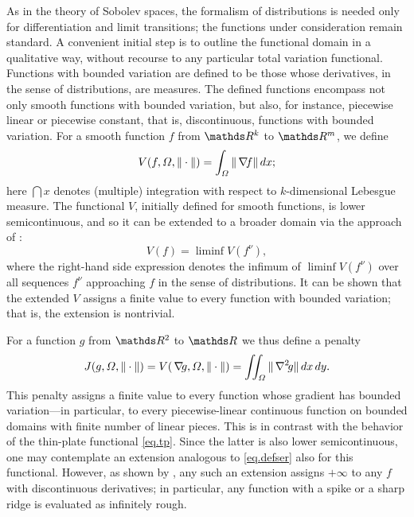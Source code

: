 As in the theory of Sobolev spaces, the formalism of distributions is
needed only for differentiation and limit transitions; the functions
under consideration remain standard. A convenient initial step is to
outline the functional domain in a qualitative way, without recourse
to any particular total variation functional. Functions with bounded
variation are defined to be those whose derivatives, in the sense of
distributions, are measures. The defined functions
encompass not only smooth functions with bounded variation, but also,
for instance, piecewise linear or piecewise constant, that is, discontinuous,
functions with bounded variation. For a smooth function $f$ from
$\RR^k$ to $\RR^m$, we define
\begin{equation}
\label{eq.defvar}
V (f, \varOmega, \|\cdot\|)
        = \int_\varOmega \| \,\nabla\! f \| \,d x;
\end{equation}
here $\dint x$ denotes (multiple) integration with respect to
$k$-dimensional Lebesgue measure. The functional $V$, initially
defined for smooth functions, is lower semicontinuous, and so it can be
extended to a broader domain via the approach of :
\begin{equation}
\label{eq.defser}
V(f) = \liminf V(f^\nu),
\end{equation}
where the right-hand side expression denotes the infimum of $\liminf
V(f^\nu)$ over all sequences $f^\nu$ approaching $f$ in the sense of
distributions. It can be shown that the extended $V$ assigns a finite
value to every function with bounded variation; that is, the extension
is nontrivial.
 
For a function $g$ from $\RR^2$ to $\RR$ we thus define a penalty
\begin{equation}
\label{eq.defpen2}
J(g, \varOmega, \| \cdot \|) =
V(\,\nabla\! g, \varOmega, \| \cdot \|) =
\iint_\varOmega \| \,\nabla^2\! g \| \,d x \,d y.
\end{equation}
This penalty assigns a finite value to every function whose gradient
has bounded variation---in particular, to every piecewise-linear
continuous function on bounded domains with finite number of linear
pieces. This is in contrast with the behavior of the thin-plate
functional \eqref{eq.tp}.  Since the latter is also lower semicontinuous,
one may contemplate an extension analogous to \eqref{eq.defser} also for
this functional.  However, as shown by ,
any such an extension assigns $+\infty$ to any $f$ with discontinuous
derivatives; in particular, any function with a spike or a sharp ridge
is evaluated as infinitely rough.
 
